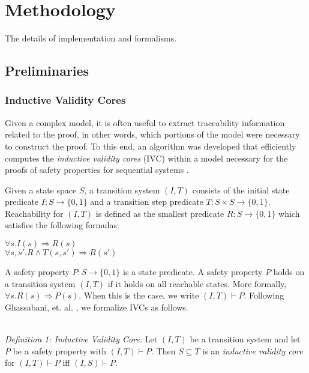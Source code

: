 \section{Methodology}

The details of implementation and formalisms. 

\subsection{Preliminaries}

\subsubsection{Inductive Validity Cores}
Given a complex model, it is often useful to extract traceability information related to the proof, in other words, which portions of the model were necessary to construct the proof. To this end, an algorithm was developed that efficiently computes the \textit{inductive validity cores} (IVC) within a model necessary for the proofs of safety properties for sequential systems \cite{DBLP:journals/corr/GhassabaniGW16}. 

Given a state space $S$, a transition system $(I,T)$ consists of the initial state predicate $I : S \rightarrow \{0,1\}$ and a transition step predicate $T : S \times S \rightarrow \{0,1\}$. Reachability for $(I,T)$ is defined as the smallest predicate $R : S \rightarrow \{0,1\}$ which satisfies the following formulas:
\begin{center}
$\forall s. I(s) \Rightarrow R(s)$\\
$\forall s, s' .  R \land T(s,s') \Rightarrow R(s')$\\
\end{center}
A safety property $P : S \to \{0,1\}$ is a state predicate. A safety property $P$ holds on a transition system $(I,T)$ if it holds on all reachable states. More formally, $\forall s . R(s) \Rightarrow P(s)$. When this is the case, we write $(I,T) \vdash P$. Following Ghassabani, et. al. \cite{DBLP:journals/corr/GhassabaniGW16}, we formalize IVCs as follows.

\\
\textit{Definition 1: Inductive Validity Core:} Let $(I,T)$ be a transition system and let $P$ be a safety property with $(I,T) \vdash P$. Then $S \subseteq T$ is an \textit{inductive validity core} for $(I,T) \vdash P$ iff $(I,S) \vdash P$.  \\

